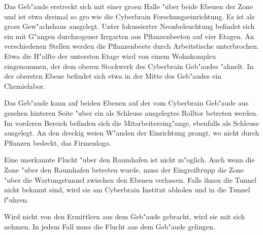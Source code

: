 Das Geb"aude erstreckt sich mit einer gro\3en Halle "uber beide Ebenen der Zone und ist etwa dreimal so gro\3 wie die Cyberbrain Forschungseinrichtung. Es ist als gro\3es Gew"achshaus ausgelegt. Unter fokussierter Neonbeleuchtung befindet sich ein mit G"angen durchzogener Irrgarten aus Pflanzenbeeten auf vier Etagen. An verschiedenen Stellen werden die Pflanzenbeete durch Arbeitstische unterbrochen. Etwa die H"alfte der untersten Etage wird von einem Wohnkomplex eingenommen, der dem oberen Stockwerk des Cyberbrain Geb"audes "ahnelt. In der obersten Ebene befindet sich etwa in der Mitte des Geb"audes ein Chemielabor.

Das Geb"aude kann auf beiden Ebenen auf der vom Cyberbrain Geb"aude aus gesehen hinteren Seite "uber ein als Schleuse ausgelegtes Rolltor betreten werden. Im vorderen Bereich befinden sich die Mitarbeitereing"ange, ebenfalls als Schleuse ausgelegt. An den dreckig wei\3en W"anden der Einrichtung prangt, wo nicht durch Pflanzen bedeckt, das Firmenlogo.

Eine unerkannte Flucht "uber den Raumhafen ist nicht m"oglich. Auch wenn die Zone "uber den Raumhafen betreten wurde, muss der Eingreiftrupp die Zone "uber die Wartungstunnel zwischen den Ebenen verlassen. Falls ihnen die Tunnel nicht bekannt sind, wird \xl{} sie am Cyberbrain Institut abholen und in die Tunnel f"uhren.

Wird \ml{} nicht von den Ermittlern aus dem Geb"aude gebracht, wird \xl{} sie mit sich nehmen. In jedem Fall muss \ml{} die Flucht aus dem Geb"aude gelingen.
\vfill

